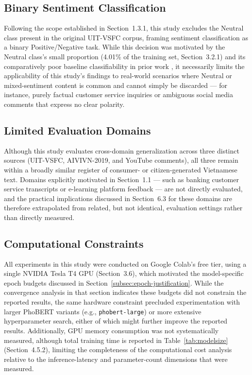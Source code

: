 \documentclass[12pt]{report} %
\begin{document}
\subsection{Binary Sentiment Classification}
Following the scope established in Section~1.3.1, this study excludes the Neutral class present in the original UIT-VSFC corpus, framing sentiment classification as a binary Positive/Negative task. While this decision was motivated by the Neutral class's small proportion (4.01\% of the training set, Section~3.2.1) and its comparatively poor baseline classifiability in prior work \cite{nguyen2018uitvsfc}, it necessarily limits the applicability of this study's findings to real-world scenarios where Neutral or mixed-sentiment content is common and cannot simply be discarded --- for instance, purely factual customer service inquiries or ambiguous social media comments that express no clear polarity.

\subsection{Limited Evaluation Domains}
Although this study evaluates cross-domain generalization across three distinct sources (UIT-VSFC, AIVIVN-2019, and YouTube comments), all three remain within a broadly similar register of consumer- or citizen-generated Vietnamese text. Domains explicitly motivated in Section~1.1 --- such as banking customer service transcripts or e-learning platform feedback --- are not directly evaluated, and the practical implications discussed in Section~6.3 for these domains are therefore extrapolated from related, but not identical, evaluation settings rather than directly measured.

\subsection{Computational Constraints}
All experiments in this study were conducted on Google Colab's free tier, using a single NVIDIA Tesla T4 GPU (Section~3.6), which motivated the model-specific epoch budgets discussed in Section~\ref{subsec:epoch-justification}. While the convergence analysis in that section indicates these budgets did not constrain the reported results, the same hardware constraint precluded experimentation with larger PhoBERT variants (e.g., \texttt{phobert-large}) or more extensive hyperparameter search, either of which might further improve the reported results. Additionally, GPU memory consumption was not systematically measured, although total training time is reported in Table~\ref{tab:modelsize} (Section~4.5.2), limiting the completeness of the computational cost analysis relative to the inference-latency and parameter-count dimensions that were measured.
\end{document}
